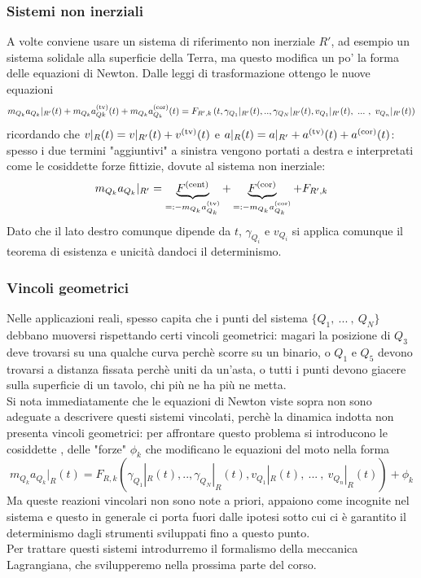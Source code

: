 \documentclass[openany]{book}
\begin{document}
\newcommand\cent{\text{(cent)}}
\subsubsection{Sistemi non inerziali}

A volte conviene usare un sistema di riferimento non inerziale $R'$, ad esempio un sistema solidale alla superficie della Terra, ma questo modifica un po' la forma delle equazioni di Newton. Dalle leggi di trasformazione ottengo le nuove equazioni 
\[ m_{Q_k}a_{Q_k}|_{R'}(t) + m_{Q_k}a_{Qk}^\tv(t) + m_{Q_k}a_{Q_k}^\cor (t) = F_{R',k}\left( t, \gamma_{Q_1}|_{R'}(t),..,\gamma_{Q_N}|_{R'}(t), v_{Q_1}|_{R'}(t),\ ...\ ,\  v_{Q_n}|_{R'}(t)  \right) \]
ricordando che $v|_R(t) = v|_{R'}(t)+v^{\text{(tv)}}(t)$ e $a|_R(t) = a|_{R'}+a^{\text{(tv)}}(t)+a^{\text{(cor)}}(t)$: spesso i due termini "aggiuntivi" a sinistra vengono portati a destra e interpretati come le cosiddette forze fittizie, dovute al sistema non inerziale:
\[ m_{Q_k}a_{Q_k}|_{R'} = \underbrace{F^\cent}_{=: -m_{Q_k}a_{Q_k}^\tv} + \underbrace{F^\cor}_{=: -m_{Q_k}a_{Q_k}^\cor} + F_{R', k} \]
Dato che il lato destro comunque dipende da $t$, $\gamma_{Q_i}$ e $v_{Q_i}$ si applica comunque il teorema di esistenza e unicità dandoci il determinismo.

\subsubsection{Vincoli geometrici}

Nelle applicazioni reali, spesso capita che i punti del sistema $\{Q_1,\ ...\ ,\ Q_N\}$ debbano muoversi rispettando certi vincoli geometrici: magari la posizione di $Q_3$ deve trovarsi su una qualche curva perchè scorre su un binario, o $Q_1$ e $Q_5$ devono trovarsi a distanza fissata perchè uniti da un'asta, o tutti i punti devono giacere sulla superficie di un tavolo, chi più ne ha più ne metta.\\
Si nota immediatamente che le equazioni di Newton viste sopra non sono adeguate a descrivere questi sistemi vincolati, perchè la dinamica indotta non presenta vincoli geometrici: per affrontare questo problema si introducono le cosiddette , delle "forze" $\phi_k$ che modificano le equazioni del moto nella forma
\[ m_{Q_k} a_{Q_k}|_R(t) = F_{R,k}\left( \gamma_{Q_1}|_{R}(t),..,\gamma_{Q_N}|_{R}(t), v_{Q_1}|_{R}(t),\ ...\ ,\  v_{Q_n}|_{R}(t)  \right) + \phi_k \]
Ma queste reazioni vincolari non sono note a priori, appaiono come incognite nel sistema e questo in generale ci porta fuori dalle ipotesi sotto cui ci è garantito il determinismo dagli strumenti sviluppati fino a questo punto.\\ 
Per trattare questi sistemi introdurremo il formalismo della meccanica Lagrangiana, che svilupperemo nella prossima parte del corso.
\end{document}
